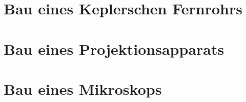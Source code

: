 \section{Bau eines Keplerschen Fernrohrs}
\section{Bau eines Projektionsapparats}
\section{Bau eines Mikroskops}